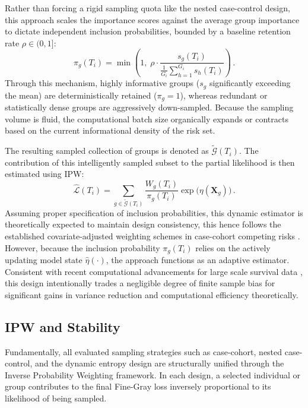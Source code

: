 \documentclass[a4paper,twoside,12pt]{report}
\begin{document}
Rather than forcing a rigid sampling quota like the nested case-control design, this approach scales the importance scores against the average group importance to dictate independent inclusion probabilities, bounded by a baseline retention rate $\rho \in (0, 1]$:
$$\pi_g(T_i) = \min \left( 1, \;\rho \cdot \frac{s_g(T_i)}{\frac{1}{G_i}\sum_{h=1}^{G_i} s_h(T_i)} \right) \,.$$
Through this mechanism, highly informative groups ($s_g$ significantly exceeding the mean) are deterministically retained ($\pi_g = 1$), whereas redundant or statistically dense groups are aggressively down-sampled. Because the sampling volume is fluid, the computational batch size organically expands or contracts based on the current informational density of the risk set. 

The resulting sampled collection of groups is denoted as $\tilde{\mathcal{G}}(T_i)$. The contribution of this intelligently sampled subset to the partial likelihood is then estimated using IPW:
$$\widehat{\mathcal{L}}(T_i) = \sum_{g \in \tilde{\mathcal{G}}(T_i)} \frac{W_g(T_i)}{\pi_g(T_i)} \exp\bigl(\eta(\boldsymbol{X}_g)\bigr) \,.$$
Assuming proper specification of inclusion probabilities, this dynamic estimator is theoretically expected to maintain design consistency, this hence follows the established covariate-adjusted weighting schemes in case-cohort competing risks \citep{kim2020stratified}. However, because the inclusion probability $\pi_g(T_i)$ relies on the actively updating model state $\hat{\eta}(\cdot)$, the approach functions as an adaptive estimator. Consistent with recent computational advancements for large scale survival data \cite{kawaguchi2020scalable}, this design intentionally trades a negligible degree of finite sample bias for significant gains in variance reduction and computational efficiency theoretically.

\subsection{IPW and Stability}
Fundamentally, all evaluated sampling strategies such as case-cohort, nested case-control, and the dynamic entropy design are structurally unified through the Inverse Probability Weighting framework. In each design, a selected individual or group contributes to the final Fine-Gray loss inversely proportional to its likelihood of being sampled. 
\end{document}
